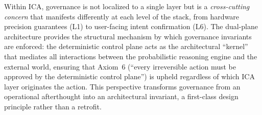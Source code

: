 Within ICA, governance is not localized to a single layer but is a \emph{cross-cutting concern} that manifests differently at each level of the stack, from hardware precision guarantees (L1) to user-facing intent confirmation (L6).
The dual-plane architecture provides the structural mechanism by which governance invariants are enforced: the deterministic control plane acts as the architectural ``kernel'' that mediates all interactions between the probabilistic reasoning engine and the external world, ensuring that Axiom~6 (``every irreversible action must be approved by the deterministic control plane'') is upheld regardless of which ICA layer originates the action.
This perspective transforms governance from an operational afterthought into an architectural invariant, a first-class design principle rather than a retrofit.
